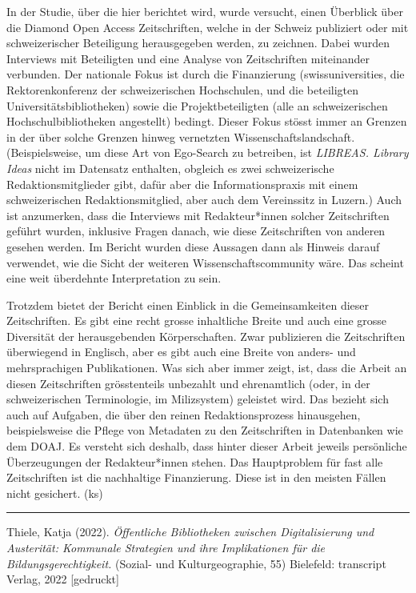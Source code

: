 \documentclass[a4paper,
fontsize=11pt,
oneside,
numbers=noperiodatend,
parskip=half-,
bibliography=totoc,
final
]{scrartcl}
\begin{document}
In der Studie, über die hier berichtet wird, wurde versucht, einen
Überblick über die Diamond Open Access Zeitschriften, welche in der
Schweiz publiziert oder mit schweizerischer Beteiligung herausgegeben
werden, zu zeichnen. Dabei wurden Interviews mit Beteiligten und eine
Analyse von Zeitschriften miteinander verbunden. Der nationale Fokus ist
durch die Finanzierung (swissuniversities, die Rektorenkonferenz der
schweizerischen Hochschulen, und die beteiligten
Universitätsbibliotheken) sowie die Projektbeteiligten (alle an
schweizerischen Hochschulbibliotheken angestellt) bedingt. Dieser Fokus
stösst immer an Grenzen in der über solche Grenzen hinweg vernetzten
Wissenschaftslandschaft. (Beispielsweise, um diese Art von Ego-Search zu
betreiben, ist \emph{LIBREAS. Library Ideas} nicht im Datensatz
enthalten, obgleich es zwei schweizerische Redaktionsmitglieder gibt,
dafür aber die Informationspraxis mit einem schweizerischen
Redaktionsmitglied, aber auch dem Vereinssitz in Luzern.) Auch ist
anzumerken, dass die Interviews mit Redakteur*innen solcher
Zeitschriften geführt wurden, inklusive Fragen danach, wie diese
Zeitschriften von anderen gesehen werden. Im Bericht wurden diese
Aussagen dann als Hinweis darauf verwendet, wie die Sicht der weiteren
Wissenschaftscommunity wäre. Das scheint eine weit überdehnte
Interpretation zu sein.

Trotzdem bietet der Bericht einen Einblick in die Gemeinsamkeiten dieser
Zeitschriften. Es gibt eine recht grosse inhaltliche Breite und auch
eine grosse Diversität der herausgebenden Körperschaften. Zwar
publizieren die Zeitschriften überwiegend in Englisch, aber es gibt auch
eine Breite von anders- und mehrsprachigen Publikationen. Was sich aber
immer zeigt, ist, dass die Arbeit an diesen Zeitschriften grösstenteils
unbezahlt und ehrenamtlich (oder, in der schweizerischen Terminologie,
im Milizsystem) geleistet wird. Das bezieht sich auch auf Aufgaben, die
über den reinen Redaktionsprozess hinausgehen, beispielsweise die Pflege
von Metadaten zu den Zeitschriften in Datenbanken wie dem DOAJ. Es
versteht sich deshalb, dass hinter dieser Arbeit jeweils persönliche
Überzeugungen der Redakteur*innen stehen. Das Hauptproblem für fast alle
Zeitschriften ist die nachhaltige Finanzierung. Diese ist in den meisten
Fällen nicht gesichert. (ks)

\begin{center}\rule{0.5\linewidth}{0.5pt}\end{center}

Thiele, Katja (2022). \emph{Öffentliche Bibliotheken zwischen
Digitalisierung und Austerität: Kommunale Strategien und ihre
Implikationen für die Bildungsgerechtigkeit.} (Sozial- und
Kulturgeographie, 55) Bielefeld: transcript Verlag, 2022 {[}gedruckt{]}
\end{document}
